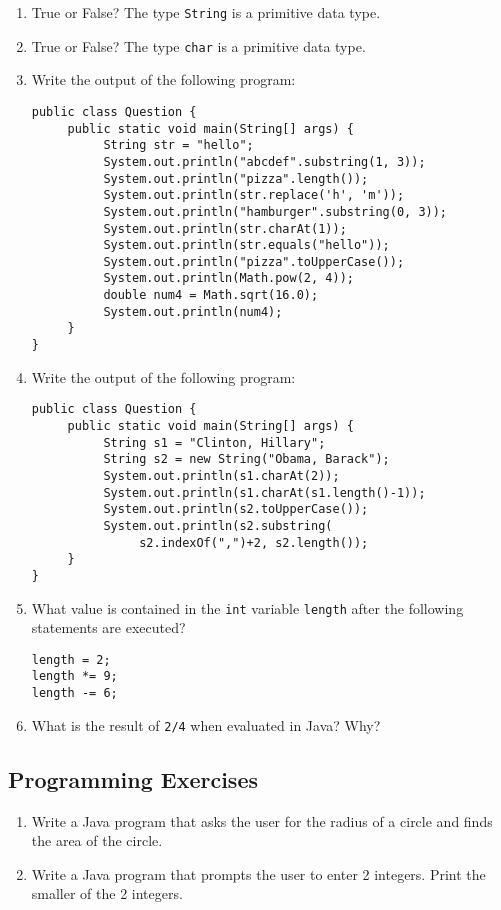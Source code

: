 \begin{enumerate}
\item True or False? The type \verb|String| is a primitive data type.

\item True or False? The type \verb|char| is a primitive data type.

\item Write the output of the following program:
\begin{lstlisting}
public class Question {
     public static void main(String[] args) {
          String str = "hello";
          System.out.println("abcdef".substring(1, 3));
          System.out.println("pizza".length());
          System.out.println(str.replace('h', 'm'));
          System.out.println("hamburger".substring(0, 3));
          System.out.println(str.charAt(1));
          System.out.println(str.equals("hello"));
          System.out.println("pizza".toUpperCase());
          System.out.println(Math.pow(2, 4));
          double num4 = Math.sqrt(16.0);
          System.out.println(num4);
     }
}
\end{lstlisting}

\item Write the output of the following program:
\begin{lstlisting}
public class Question {
     public static void main(String[] args) {
          String s1 = "Clinton, Hillary";
          String s2 = new String("Obama, Barack");
          System.out.println(s1.charAt(2));
          System.out.println(s1.charAt(s1.length()-1));
          System.out.println(s2.toUpperCase());
          System.out.println(s2.substring(
               s2.indexOf(",")+2, s2.length());
     }
}
\end{lstlisting}

\item What value is contained in the \verb|int| variable \verb|length| after the following statements are executed?
\begin{lstlisting}
length = 2;
length *= 9;
length -= 6;
\end{lstlisting}

\item What is the result of \verb|2/4| when evaluated in Java? Why?

\end{enumerate}

\subsection{Programming Exercises}

\begin{enumerate}

\item Write a Java program that asks the user for the radius of a circle and finds the area of the circle.

\item Write a Java program that prompts the user to enter 2 integers. Print the smaller of the 2 integers.

\end{enumerate}